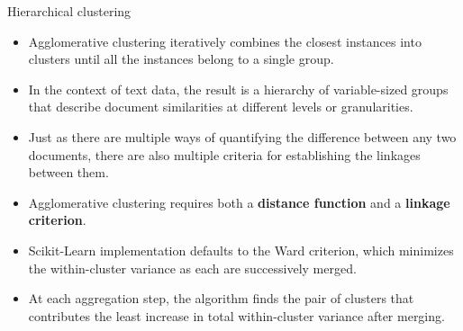 \documentclass[11pt]{beamer}
\begin{document}
\begin{frame}{Hierarchical clustering}
	\begin{itemize}
		\item Agglomerative clustering iteratively combines the closest instances into clusters until all the instances belong to a single group. 
		\item In the context of text data, the result is a hierarchy of variable-sized groups that describe document similarities at different levels or granularities.
		\item Just as there are multiple ways of quantifying the difference between any two documents, there are also multiple criteria for establishing the linkages between them. 
		\item Agglomerative clustering requires both a \textbf{distance function} and a \textbf{linkage criterion}. 
		\item Scikit-Learn implementation defaults to the Ward criterion, which minimizes the within-cluster variance as each are successively merged. 
		\item At each aggregation step, the algorithm finds the pair of clusters that contributes the least increase in total within-cluster variance after merging.
	\end{itemize}
\end{frame}
\end{document}
